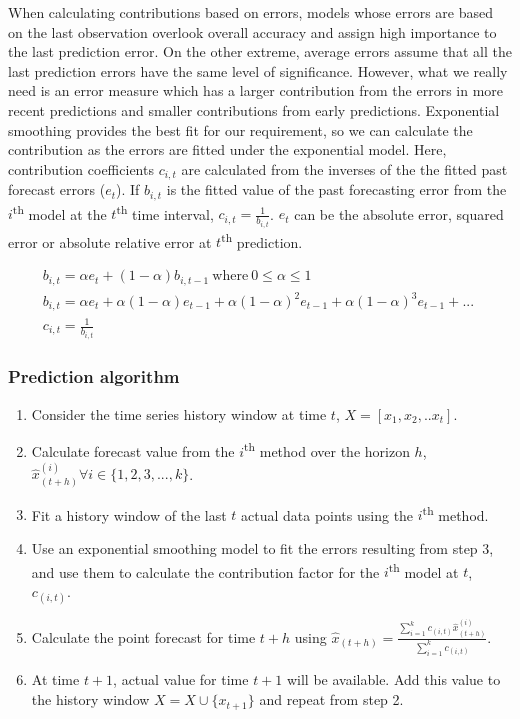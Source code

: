 When calculating contributions based on errors, models whose errors are based on the last observation overlook overall accuracy and assign high importance to the last prediction error. On the other extreme, average errors assume that all the last prediction errors have the same level of significance. However, what we really need is an error measure which has a larger contribution from the errors in more recent predictions and smaller contributions from early predictions. Exponential smoothing provides the best fit for our requirement, so we can calculate the contribution as the errors are fitted under the exponential model. Here, contribution coefficients $c_{i,t}$ are calculated from the inverses of the the fitted past forecast errors ($e_{t}$). If $b_{i,t}$ is the fitted value of the past forecasting error from the $i$\textsuperscript{th} model at the $t$\textsuperscript{th} time interval, $c_{i,t}=\frac{1}{b_{i,t}}$. $e_{t}$ can be the absolute error, squared error or absolute relative error at $t$\textsuperscript{th} prediction.

\begin{multline}
b_{i,t}= \alpha e_t + (1-\alpha)b_{i,t-1} \ \mathrm{where} \ 0\leq \alpha \leq 1	\\ 
b_{i,t}=\alpha e_t + \alpha(1-\alpha)e_{t-1}+\alpha(1-\alpha)^2e_{t-1}+\alpha(1-\alpha)^3e_{t-1}+ . .. \  \\
 c_{i,t}=\frac{1}{b_{i,t}}
\end{multline}

\subsubsection{Prediction algorithm}

\begin{enumerate}
\item Consider the time series history window at time $t$, $X=[x_{1},x_{2},.. x_{t}]$.
\item Calculate forecast value from the $i$\textsuperscript{th} method over the horizon $h$, $\hat{x}_{(t+h)}^{(i)} \forall i \in \{1,2,3,...,k\}$.
\item Fit a history window of the last $t$ actual data points using the $i$\textsuperscript{th} method.
\item Use an exponential smoothing model to fit the errors resulting from step 3, and use them to calculate the contribution factor for the $i$\textsuperscript{th} model at $t$, $c_{(i,t)}$.
\item Calculate the point forecast for time $t+h$ using
$\hat{x}_{(t+h)}= \frac{\sum_{i=1}^{k}c_{(i,t)} \hat{x}_{(t+h)}^{(i)}}{\sum_{i=1}^{k}c_{(i,t)}}$.
\item At time $t+1$, actual value for time $t+1$ will be available. Add this value to the history window $X=X\cup \{x_{t+1}\}$ and repeat from step 2.
\end{enumerate}
